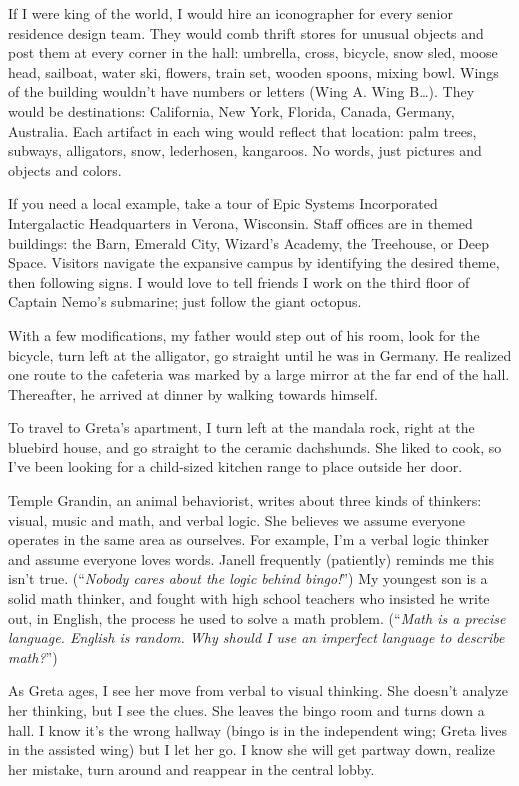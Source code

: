 \documentclass[
  letterpaper,
  DIV=11,
  numbers=noendperiod]{scrreprt}
\begin{document}
If I were king of the world, I would hire an iconographer for every
senior residence design team. They would comb thrift stores for unusual
objects and post them at every corner in the hall: umbrella, cross,
bicycle, snow sled, moose head, sailboat, water ski, flowers, train set,
wooden spoons, mixing bowl. Wings of the building wouldn't have numbers
or letters (Wing A. Wing B\ldots). They would be destinations:
California, New York, Florida, Canada, Germany, Australia. Each artifact
in each wing would reflect that location: palm trees, subways,
alligators, snow, lederhosen, kangaroos. No words, just pictures and
objects and colors.

If you need a local example, take a tour of Epic Systems Incorporated
Intergalactic Headquarters in Verona, Wisconsin. Staff offices are in
themed buildings: the Barn, Emerald City, Wizard's Academy, the
Treehouse, or Deep Space. Visitors navigate the expansive campus by
identifying the desired theme, then following signs. I would love to
tell friends I work on the third floor of Captain Nemo's submarine; just
follow the giant octopus.

With a few modifications, my father would step out of his room, look for
the bicycle, turn left at the alligator, go straight until he was in
Germany. He realized one route to the cafeteria was marked by a large
mirror at the far end of the hall. Thereafter, he arrived at dinner by
walking towards himself.

To travel to Greta's apartment, I turn left at the mandala rock, right
at the bluebird house, and go straight to the ceramic dachshunds. She
liked to cook, so I've been looking for a child-sized kitchen range to
place outside her door.

Temple Grandin, an animal behaviorist, writes about three kinds of
thinkers: visual, music and math, and verbal logic. She believes we
assume everyone operates in the same area as ourselves. For example, I'm
a verbal logic thinker and assume everyone loves words. Janell
frequently (patiently) reminds me this isn't true. (``\emph{Nobody cares
about the logic behind bingo!}'') My youngest son is a solid math
thinker, and fought with high school teachers who insisted he write out,
in English, the process he used to solve a math problem. (``\emph{Math
is a precise language. English is random. Why should I use an imperfect
language to describe math?}'')

As Greta ages, I see her move from verbal to visual thinking. She
doesn't analyze her thinking, but I see the clues. She leaves the bingo
room and turns down a hall. I know it's the wrong hallway (bingo is in
the independent wing; Greta lives in the assisted wing) but I let her
go. I know she will get partway down, realize her mistake, turn around
and reappear in the central lobby.
\end{document}

